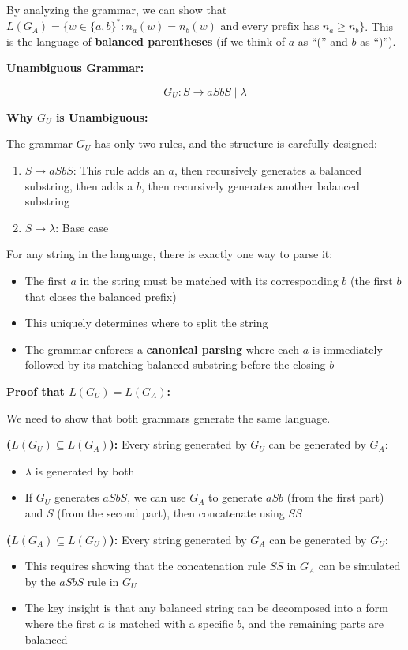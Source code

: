 \documentclass[12pt]{article}
\begin{document}
By analyzing the grammar, we can show that $L(G_A) = \{w \in \{a,b\}^* : n_a(w) = n_b(w) \text{ and every prefix has } n_a \ge n_b\}$. This is the language of \textbf{balanced parentheses} (if we think of $a$ as ``('' and $b$ as ``)'').

\textbf{Unambiguous Grammar:}

$$G_U: S \rightarrow aSbS \mid \lambda$$

\textbf{Why $G_U$ is Unambiguous:}

The grammar $G_U$ has only two rules, and the structure is carefully designed:
\begin{enumerate}
\item $S \rightarrow aSbS$: This rule adds an $a$, then recursively generates a balanced substring, then adds a $b$, then recursively generates another balanced substring
\item $S \rightarrow \lambda$: Base case
\end{enumerate}

For any string in the language, there is exactly one way to parse it:
\begin{itemize}
\item The first $a$ in the string must be matched with its corresponding $b$ (the first $b$ that closes the balanced prefix)
\item This uniquely determines where to split the string
\item The grammar enforces a \textbf{canonical parsing} where each $a$ is immediately followed by its matching balanced substring before the closing $b$
\end{itemize}

\textbf{Proof that $L(G_U) = L(G_A)$:}

We need to show that both grammars generate the same language.

\textbf{($L(G_U) \subseteq L(G_A)$):} Every string generated by $G_U$ can be generated by $G_A$:
\begin{itemize}
\item $\lambda$ is generated by both
\item If $G_U$ generates $aSbS$, we can use $G_A$ to generate $aSb$ (from the first part) and $S$ (from the second part), then concatenate using $SS$
\end{itemize}

\textbf{($L(G_A) \subseteq L(G_U)$):} Every string generated by $G_A$ can be generated by $G_U$:
\begin{itemize}
\item This requires showing that the concatenation rule $SS$ in $G_A$ can be simulated by the $aSbS$ rule in $G_U$
\item The key insight is that any balanced string can be decomposed into a form where the first $a$ is matched with a specific $b$, and the remaining parts are balanced
\end{itemize}
\end{document}
